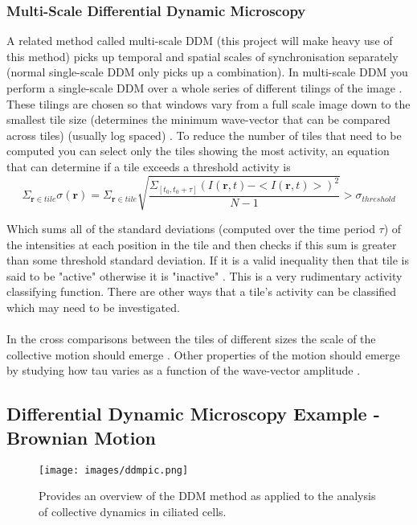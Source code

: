 \documentclass[10pt]{article}
\begin{document}
\subsubsection{Multi-Scale Differential Dynamic Microscopy}
A related method called multi-scale DDM (this project will make heavy use of this method) picks up temporal and spatial scales of synchronisation separately (normal single-scale DDM only picks up a combination).
In multi-scale DDM you perform a single-scale DDM over a whole series of different tilings of the image \cite{ddm1}. These tilings are chosen so that windows vary from a full scale image down to the smallest tile size (determines the minimum wave-vector that can be compared across tiles) (usually log spaced) \cite{ddm1}.
To reduce the number of tiles that need to be computed you can select only the tiles showing the most activity, an equation that can determine if a tile exceeds a threshold activity is
\begin{equation}
    \Sigma_{\textbf{r} \in tile} \sigma(\textbf{r}) = \Sigma_{\textbf{r} \in tile} \sqrt{\frac{\Sigma_{[t_0, t_0 + \tau]} (I(\mathbf{r}, t) - <I(\mathbf{r}, t)>)^2}{N - 1}} > \sigma_{threshold}
\end{equation}

Which sums all of the standard deviations (computed over the time period $\tau$) of the intensities at each position in the tile and then checks if this sum is greater than some threshold standard deviation.
If it is a valid inequality then that tile is said to be "active" otherwise it is "inactive" \cite{ddm2}.
This is a very rudimentary activity classifying function.
There are other ways that a tile's activity can be classified which may need to be investigated.
\\\\
In the cross comparisons between the tiles of different sizes the scale of the collective motion should emerge \cite{ddm1}.
Other properties of the motion should emerge by studying how tau varies as a function of the wave-vector amplitude \cite{ddm1}.

\subsection{Differential Dynamic Microscopy Example - Brownian Motion}

\begin{figure}[H]
\centering
\texttt{[image: images/ddmpic.png]}
\caption{Provides an overview of the DDM method as applied to the analysis of collective dynamics in ciliated cells.\cite{ddm2}}
\end{figure}
\end{document}
